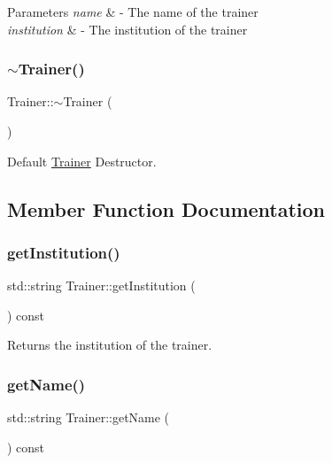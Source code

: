 \begin{DoxyParams}{Parameters}
{\em name} & -\/ The name of the trainer \\
\hline
{\em institution} & -\/ The institution of the trainer \\
\hline
\end{DoxyParams}
\mbox{\label{classTrainer_aa3d993d1eb090f4111e12a710fe9d3f6}} 
\subsubsection{\texorpdfstring{$\sim$\+Trainer()}{~Trainer()}}
{\footnotesize\ttfamily Trainer\+::$\sim$\+Trainer (\begin{DoxyParamCaption}{ }\end{DoxyParamCaption})}



Default \hyperlink{classTrainer}{Trainer} Destructor. 



\subsection{Member Function Documentation}
\mbox{\label{classTrainer_a92ce4244bea56ae32c0ba33fdd959667}} 
\subsubsection{\texorpdfstring{get\+Institution()}{getInstitution()}}
{\footnotesize\ttfamily std\+::string Trainer\+::get\+Institution (\begin{DoxyParamCaption}{ }\end{DoxyParamCaption}) const\hspace{0.3cm}{\ttfamily [inline]}}



Returns the institution of the trainer. 

\mbox{\label{classTrainer_a4bf23e8eaefc7c2f400b4ba14f2e1c69}} 
\subsubsection{\texorpdfstring{get\+Name()}{getName()}}
{\footnotesize\ttfamily std\+::string Trainer\+::get\+Name (\begin{DoxyParamCaption}{ }\end{DoxyParamCaption}) const\hspace{0.3cm}{\ttfamily [inline]}}



